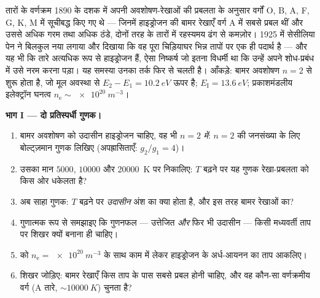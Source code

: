 \begin{problem}[{सप्ताहांत समस्या --- साहा, पेन, और ब्रह्मांड
किससे बना है}]\label{pb:b3:grand-canonical:1}
तारों के वर्णक्रम 1890 के दशक में अपनी अवशोषण-रेखाओं की प्रबलता के
अनुसार वर्गों O, B, A, F, G, K, M में सूचीबद्ध किए गए थे ---
जिनमें हाइड्रोजन की बामर रेखाएँ वर्ग A में सबसे प्रबल थीं और उससे
अधिक गरम तथा अधिक ठंडे, दोनों तरह के तारों में रहस्यमय ढंग से
कमज़ोर। 1925 में सेसीलिया पेन ने बिलकुल नया  लगाया और
दिखाया कि वह पूरा चिड़ियाघर भिन्न तापों पर एक ही पदार्थ है --- और यह
भी कि तारे अत्यधिक रूप से हाइड्रोजन हैं, ऐसा निष्कर्ष जो इतना
विधर्मी था कि उन्हें अपने शोध-प्रबंध में उसे नरम करना पड़ा। यह समस्या
उनका तर्क फिर से चलती है।
आँकड़े: बामर अवशोषण $n = 2$ से शुरू होता है, जो मूल अवस्था से $E_2 - E_1 =
\qty{10.2}{eV}$ ऊपर है; $E_{\text{I}} =
\qty{13.6}{eV}$; प्रकाशमंडलीय इलेक्ट्रॉन घनत्व $n_{\text{e}}
\sim \qty{e20}{m^{-3}}$।

\medskip\noindent\textbf{भाग I --- दो प्रतिस्पर्धी गुणक।}
\begin{enumerate}
  \item बामर अवशोषण को उदासीन हाइड्रोजन चाहिए, वह भी $n =
        2$ \emph{में}: $n = 2$ की जनसंख्या के लिए बोल्ट्ज़मान गुणक
        लिखिए (अपह्रासिताएँ: $g_2/g_1 = 4$)।
  \item उसका मान $5000$, $10000$ और \qty{20000}{K} पर निकालिए: $T$
        बढ़ने पर यह गुणक रेखा-प्रबलता को किस ओर धकेलता है?
  \item अब साहा गुणक: $T$ बढ़ने पर \emph{उदासीन} अंश का क्या होता
        है, और इस तरह बामर रेखाओं का?
  \item गुणात्मक रूप से समझाइए कि गुणनफल --- उत्तेजित \emph{और}
        फिर भी उदासीन --- किसी मध्यवर्ती ताप पर शिखर क्यों बनाना
        ही चाहिए।
  \item {} को $n_{\text{e}} =
        \qty{e20}{m^{-3}}$ के साथ काम में लेकर हाइड्रोजन के
        अर्ध-आयनन का ताप आकलिए।
  \item शिखर जोड़िए: बामर रेखाएँ किस ताप के पास सबसे प्रबल होनी
        चाहिए, और वह कौन-सा वर्णक्रमीय वर्ग
        (A तारे, $\sim\qty{10000}{K}$) चुनता है?
\end{enumerate}


\end{problem}
